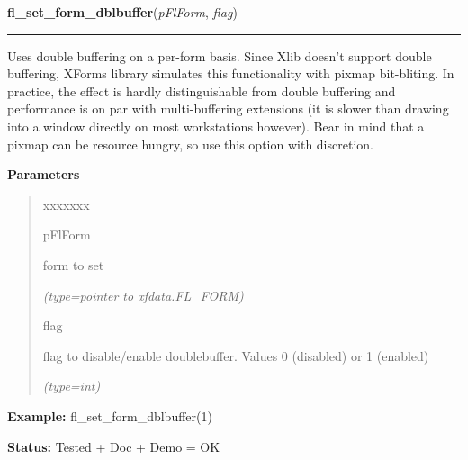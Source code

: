 \hspace{.8\funcindent}\begin{boxedminipage}{\funcwidth}

    \raggedright \textbf{fl\_set\_form\_dblbuffer}(\textit{pFlForm}, \textit{flag})

    \vspace{-1.5ex}

    \rule{\textwidth}{0.5\fboxrule}
\setlength{\parskip}{2ex}
    Uses double buffering on a per-form basis. Since Xlib doesn't support 
    double buffering, XForms library simulates this functionality with 
    pixmap bit-bliting. In practice, the effect is hardly distinguishable 
    from double buffering and performance is on par with multi-buffering 
    extensions (it is slower than drawing into a window directly on most 
    workstations however). Bear in mind that a pixmap can be resource 
    hungry, so use this option with discretion.

\setlength{\parskip}{1ex}
      \textbf{Parameters}
      \vspace{-1ex}

      \begin{quote}
        \begin{Ventry}{xxxxxxx}

          \item[pFlForm]

          form to set

            {\it (type=pointer to xfdata.FL\_FORM)}

          \item[flag]

          flag to disable/enable doublebuffer. Values 0 (disabled) or 1 
          (enabled)

            {\it (type=int)}

        \end{Ventry}

      \end{quote}

\textbf{Example:} fl\_set\_form\_dblbuffer(1)



\textbf{Status:} Tested + Doc + Demo = OK



    \end{boxedminipage}

    \label{xformslib:flbasic:fl_prepare_form_window}

